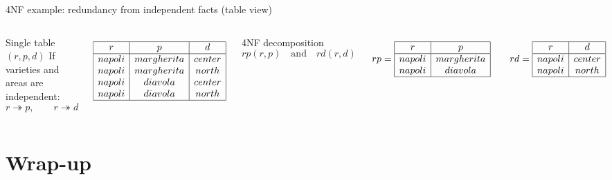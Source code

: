 \documentclass[10pt,aspectratio=169]{beamer}
\newenvironment{examplebox}[1][Example]{\begin{exampleblock}{#1}}{\end{exampleblock}}
\newcommand{\mvd}{\twoheadrightarrow}
\begin{document}
\begin{frame}{4NF example: redundancy from independent facts (table view)}
\scriptsize
\begin{columns}[T,onlytextwidth]
\begin{examplebox}[Single table \((r,p,d)\)]
If varieties and areas are independent:
\[
r \mvd p,\qquad r \mvd d
\]
\end{examplebox}
\vspace{-0.2em}
\[
\begin{array}{|c|c|c|}\hline
r & p & d\\\hline
napoli & margherita & center\\
napoli & margherita & north\\
napoli & diavola    & center\\
napoli & diavola    & north\\\hline
\end{array}
\]

\begin{examplebox}[4NF decomposition]
\[
rp(r,p)\quad\text{and}\quad rd(r,d)
\]
\end{examplebox}
\vspace{-0.2em}
\[
rp=\begin{array}{|c|c|}\hline
r & p\\\hline
napoli & margherita\\
napoli & diavola\\\hline
\end{array}
\qquad
rd=\begin{array}{|c|c|}\hline
r & d\\\hline
napoli & center\\
napoli & north\\\hline
\end{array}
\]
\end{columns}
\end{frame}

\section{Wrap-up}
\end{document}
